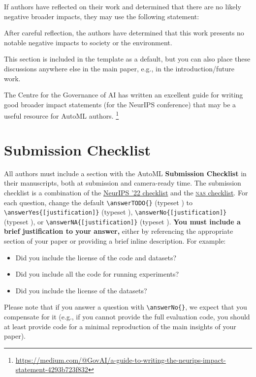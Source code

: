 \documentclass[11pt]{article}
\begin{document}
If authors have reflected on their work and determined that there are no likely
negative broader impacts, they may use the following statement:

\begin{displayquote}
After careful reflection, the authors have determined that this work presents no notable
negative impacts to society or the environment.
\end{displayquote}

This section is included in the template as a default, but you can also place these
discussions anywhere else in the main paper, e.g., in the introduction/future work.

The Centre for the Governance of AI has written an excellent guide for writing
good broader impact statements (for the NeurIPS conference) that may be a useful
resource for AutoML authors.%
%
\footnote{\url{https://medium.com/@GovAI/a-guide-to-writing-the-neurips-impact-statement-4293b723f832}}

\section{Submission Checklist}

All authors must include a section with the AutoML \textbf{Submission
Checklist} in their manuscripts, both at submission and camera-ready time.
The submission checklist is a combination of the
%
\href{https://neurips.cc/Conferences/2022/PaperInformation/PaperChecklist}
     {NeurIPS '22 checklist}
%
and the
\href{https://www.automl.org/wp-content/uploads/NAS/NAS_checklist.pdf}
     {\textsc{nas} checklist}.
%
For each question, change the default \verb|\answerTODO{}| (typeset \answerTODO)
to
\verb|\answerYes{[justification]}| (typeset \answerYes),
\verb|\answerNo{[justification]}| (typeset \answerNo), or
\verb|\answerNA{[justification]}| (typeset \answerNA).
\textbf{You must include a brief justification to your answer,} either by
referencing the appropriate section of your paper or providing a brief inline
description.  For example:
\begin{itemize}
\item Did you include the license of the code and datasets? 
\item Did you include all the code for running experiments? 
\item Did you include the license of the datasets? 
\end{itemize}
Please note that if you answer a question with \verb|\answerNo{}|, we expect
that you compensate for it (e.g., if you cannot provide the full evaluation
code, you should at least provide code for a minimal reproduction of the main
insights of your paper).
\end{document}
